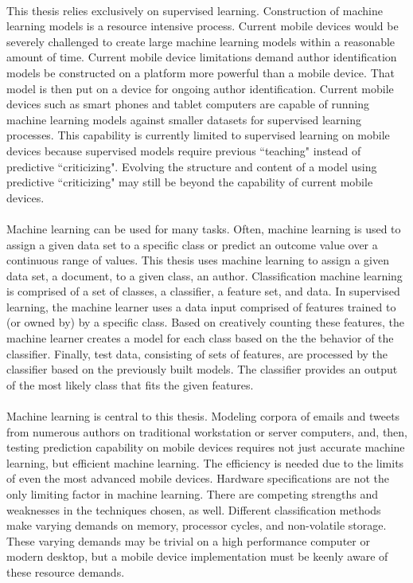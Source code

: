 	\paragraph{} This thesis relies exclusively on supervised learning. Construction of machine learning models is a resource intensive process.  Current mobile devices would be severely challenged to create large machine learning models within a reasonable amount of time. Current mobile device limitations demand author identification models be constructed on a platform more powerful than a mobile device.  That model is then put on a device for ongoing author identification. Current mobile devices such as smart phones and tablet computers are capable of running machine learning models against smaller datasets for supervised learning processes. This capability is currently limited to supervised learning on mobile devices because supervised  models require previous ``teaching" instead of predictive ``criticizing".  Evolving the structure and content of a model using predictive ``criticizing" may still be beyond the capability of current mobile devices.

	\paragraph{}Machine learning can be used for many tasks.  Often, machine learning is used to assign a given data set to a specific class or predict an outcome value over a continuous range of values. This thesis uses machine learning to assign a given data set, a document, to a given class, an author. Classification machine learning is comprised of a set of classes, a classifier, a feature set, and data.  In supervised learning, the machine learner uses a data input comprised of features trained to (or owned by) by a specific class.  Based on creatively counting these features, the machine learner creates a model for each class based on the the behavior of the classifier.  Finally, test data, consisting of sets of features, are processed by the classifier based on the previously built models.  The classifier provides an output of the most likely class that fits the given features.

	\paragraph{}Machine learning is central to this thesis.  Modeling corpora of emails and tweets from numerous authors on traditional workstation or server computers, and, then, testing prediction capability on mobile devices requires not just accurate machine learning, but efficient machine learning.  The efficiency is needed due to the limits of even the most advanced mobile devices. Hardware specifications are not the only limiting factor in machine learning.  There are competing strengths and weaknesses in the techniques chosen, as well.  Different classification methods make varying demands on memory, processor cycles, and non-volatile storage.  These varying demands may be trivial on a high performance computer or modern desktop, but a mobile device implementation must be keenly aware of these resource demands.
	
